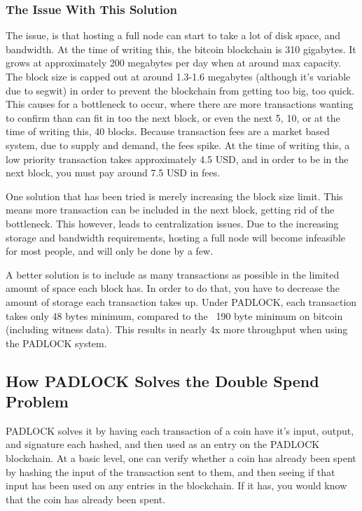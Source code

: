 \documentclass[12pt, letterpaper]{article}
\begin{document}
\subsubsection{The Issue With This Solution}
The issue, is that hosting a full node can start to take a lot of disk space,
and bandwidth. At the time of writing this, the bitcoin blockchain is 310
gigabytes. It grows at approximately 200 megabytes per day when at around max
capacity. The block size is capped out at around 1.3-1.6 megabytes (although
it's variable due to segwit) in order to prevent the blockchain from getting too
big, too quick. This causes for a bottleneck to occur, where there are more
transactions wanting to confirm than can fit in too the next block, or even the next
5, 10, or at the time of writing this, 40 blocks. Because transaction fees are a
market based system, due to supply and demand, the fees spike. At the time of
writing this, a low priority transaction takes approximately 4.5 USD, and in
order to be in the next block, you must pay around 7.5 USD in fees.

One solution that has been tried is merely increasing the block size limit. This
means more transaction can be included in the next block, getting rid of the
bottleneck. This however, leads to centralization issues. Due to the increasing
storage and bandwidth requirements, hosting a full node will become infeasible
for most people, and will only be done by a few.

A better solution is to include as many transactions as possible in the limited
amount of space each block has. In order to do that, you have to decrease the
amount of storage each transaction takes up. Under PADLOCK, each transaction
takes only 48 bytes minimum, compared to the ~190 byte minimum on bitcoin
(including witness data). This results in nearly 4x more throughput when using
the PADLOCK system.

\subsection{How PADLOCK Solves the Double Spend Problem}
PADLOCK solves it by having each transaction of a coin have it's input, output,
and signature each hashed, and then used as an entry on the PADLOCK blockchain.
At a basic level, one can verify whether a coin has already been spent by
hashing the input of the transaction sent to them, and then seeing if that input
has been used on any entries in the blockchain. If it has, you would know that
the coin has already been spent.
\end{document}
